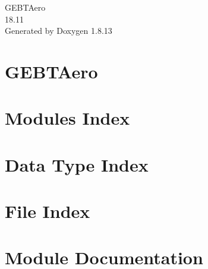 \documentclass[twoside]{book}
\newcommand{\+}{\discretionary{\mbox{\scriptsize$\hookleftarrow$}}{}{}}
\newcommand{\clearemptydoublepage}{%
  \newpage{\pagestyle{empty}\cleardoublepage}%
}
\begin{document}
\hypersetup{pageanchor=false,
             bookmarksnumbered=true,
             pdfencoding=unicode
            }
\begin{titlepage}
\vspace*{7cm}
\begin{center}%
{\Large G\+E\+B\+T\+Aero \\[1ex]\large 18.\+11 }\\
\vspace*{1cm}
{\large Generated by Doxygen 1.8.13}\\
\end{center}
\end{titlepage}
\clearemptydoublepage
{}
\tableofcontents
\clearemptydoublepage
{}
\hypersetup{pageanchor=true}

\chapter{G\+E\+B\+T\+Aero}
\label{index}\hypertarget{index}{}
\chapter{Modules Index}

\chapter{Data Type Index}

\chapter{File Index}

\chapter{Module Documentation}





























\end{document}
